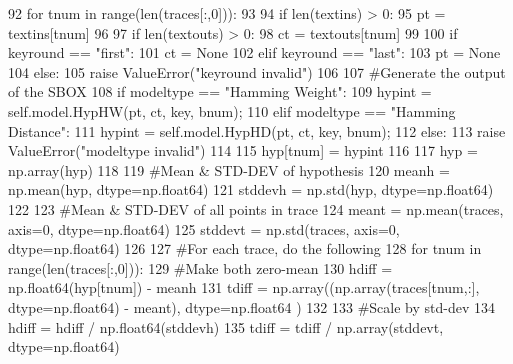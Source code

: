 \begin{DoxyCode}
{92                 \textcolor{keywordflow}{for} tnum \textcolor{keywordflow}{in} range(len(traces[:,0])):
93 
94                     \textcolor{keywordflow}{if} len(textins) > 0:
95                         pt = textins[tnum]
96 
97                     \textcolor{keywordflow}{if} len(textouts) > 0:
98                         ct = textouts[tnum]
99 
100                     \textcolor{keywordflow}{if} keyround == \textcolor{stringliteral}{"first"}:
101                         ct = \textcolor{keywordtype}{None}
102                     \textcolor{keywordflow}{elif} keyround == \textcolor{stringliteral}{"last"}:
103                         pt = \textcolor{keywordtype}{None}
104                     \textcolor{keywordflow}{else}:
105                         \textcolor{keywordflow}{raise} ValueError(\textcolor{stringliteral}{"keyround invalid"})
106 
107                     \textcolor{comment}{#Generate the output of the SBOX}
108                     \textcolor{keywordflow}{if} modeltype == \textcolor{stringliteral}{"Hamming Weight"}:
109                         hypint = self.model.HypHW(pt, ct, key, bnum);
110                     \textcolor{keywordflow}{elif} modeltype == \textcolor{stringliteral}{"Hamming Distance"}:
111                         hypint = self.model.HypHD(pt, ct, key, bnum);
112                     \textcolor{keywordflow}{else}:
113                         \textcolor{keywordflow}{raise} ValueError(\textcolor{stringliteral}{"modeltype invalid"})
114 
115                     hyp[tnum] = hypint
116 
117                 hyp = np.array(hyp)
118 
119                 \textcolor{comment}{#Mean & STD-DEV of hypothesis}
120                 meanh = np.mean(hyp, dtype=np.float64)
121                 stddevh = np.std(hyp, dtype=np.float64)
122 
123                 \textcolor{comment}{#Mean & STD-DEV of all points in trace}
124                 meant = np.mean(traces, axis=0, dtype=np.float64)
125                 stddevt = np.std(traces, axis=0, dtype=np.float64)
126 
127                 \textcolor{comment}{#For each trace, do the following}
128                 \textcolor{keywordflow}{for} tnum \textcolor{keywordflow}{in} range(len(traces[:,0])):
129                     \textcolor{comment}{#Make both zero-mean}
130                     hdiff = np.float64(hyp[tnum]) - meanh
131                     tdiff = np.array((np.array(traces[tnum,:], dtype=np.float64) - meant), dtype=np.float64
      )
132 
133                     \textcolor{comment}{#Scale by std-dev}
134                     hdiff = hdiff / np.float64(stddevh)
135                     tdiff = tdiff / np.array(stddevt, dtype=np.float64)
}
\end{DoxyCode}
